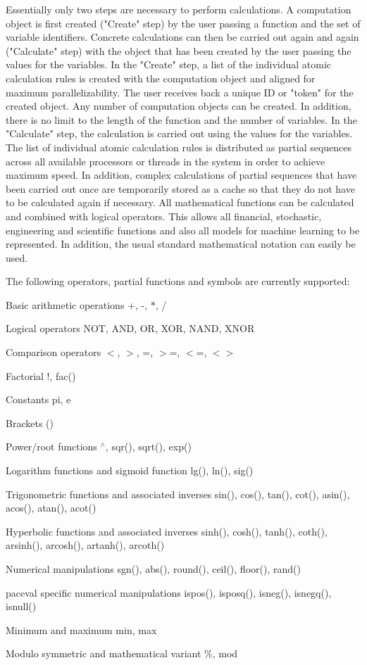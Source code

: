 Essentially only two steps are necessary to perform calculations. A computation object is first created ("{}\+Create"{} step) by the user passing a function and the set of variable identifiers. Concrete calculations can then be carried out again and again ("{}\+Calculate"{} step) with the object that has been created by the user passing the values for the variables. In the "{}\+Create"{} step, a list of the individual atomic calculation rules is created with the computation object and aligned for maximum parallelizability. The user receives back a unique ID or "{}token"{} for the created object. Any number of computation objects can be created. In addition, there is no limit to the length of the function and the number of variables. In the "{}\+Calculate"{} step, the calculation is carried out using the values for the variables. The list of individual atomic calculation rules is distributed as partial sequences across all available processors or threads in the system in order to achieve maximum speed. In addition, complex calculations of partial sequences that have been carried out once are temporarily stored as a cache so that they do not have to be calculated again if necessary. All mathematical functions can be calculated and combined with logical operators. This allows all financial, stochastic, engineering and scientific functions and also all models for machine learning to be represented. In addition, the usual standard mathematical notation can easily be used.

The following operators, partial functions and symbols are currently supported\+:
\begin{DoxyItemize}
\item Basic arithmetic operations +, -\/, \texorpdfstring{$\ast$}{*}, /
\item Logical operators NOT, AND, OR, XOR, NAND, XNOR
\item Comparison operators \texorpdfstring{$<$}{<}, \texorpdfstring{$>$}{>}, =, \texorpdfstring{$>$}{>}=, \texorpdfstring{$<$}{<}=, \texorpdfstring{$<$}{<}\texorpdfstring{$>$}{>}
\item Factorial !, fac()
\item Constants pi, e
\item Brackets ()
\item Power/root functions \texorpdfstring{$^\wedge$}{\string^}, sqr(), sqrt(), exp()
\item Logarithm functions and sigmoid function lg(), ln(), sig()
\item Trigonometric functions and associated inverses sin(), cos(), tan(), cot(), asin(), acos(), atan(), acot()
\item Hyperbolic functions and associated inverses sinh(), cosh(), tanh(), coth(), arsinh(), arcosh(), artanh(), arcoth()
\item Numerical manipulations sgn(), abs(), round(), ceil(), floor(), rand()
\item paceval specific numerical manipulations ispos(), isposq(), isneg(), isnegq(), isnull()
\item Minimum and maximum min, max
\item Modulo symmetric and mathematical variant \%, mod
\end{DoxyItemize}

